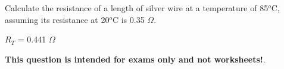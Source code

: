 

Calculate the resistance of a length of silver wire at a temperature of 85$^{o}$C, assuming its resistance at 20$^{o}$C is 0.35 $\Omega$.  







$R_T$ = 0.441 $\Omega$







{\bf This question is intended for exams only and not worksheets!}.




